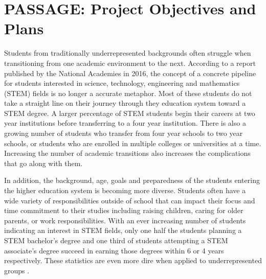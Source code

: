 \documentclass[12pt]{article}
\begin{document}
\section{PASSAGE: Project Objectives and Plans}
\vspace{-3mm}

Students from traditionally underrepresented backgrounds often struggle when transitioning from one academic environment to the next.  According to a report published by the National Academies in 2016, the concept of a concrete pipeline for students interested in science, technology, engineering and mathematics (STEM) fields is no longer a accurate metaphor.  Most of these students do not take a straight line on their journey through they education system toward a STEM degree.  A larger percentage of STEM students begin their careers at two year institutions before transferring to a four year institution.  There is also a growing number of students who transfer from four year schools to two year schools, or students who are enrolled in multiple colleges or universities at a time. Increasing the number of academic transitions also increases the complications that go along with them. 

In addition, the background, age, goals and preparedness of the students entering the higher education system is becoming more diverse. Students often have a wide variety of responsibilities outside of school that can impact their focus and time commitment to their studies including raising children, caring for older parents, or work responsibilities.  With an ever increasing number of students indicating an interest in STEM fields, only one half the students planning a STEM bachelor's degree and one third of students attempting a STEM associate's degree succeed in earning those degrees within 6 or 4 years respectively.  These statistics are even more dire when applied to underrepresented groups \citep{NAP21739}. %
\end{document}
